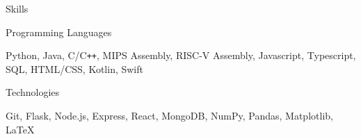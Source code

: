 \documentclass{resume}
\begin{document}
\begin{rSection}{\large Skills}
\begin{rSubsection}{Programming Languages}{}{}{}
\item Python, Java, C/C{}\verb!++!, MIPS Assembly, RISC-V Assembly, Javascript, Typescript, SQL, HTML/CSS, Kotlin, Swift
\end{rSubsection}

\begin{rSubsection}{Technologies}{}{}{}
\item Git, Flask, Node.js, Express, React, MongoDB, NumPy, Pandas, Matplotlib, LaTeX
\end{rSubsection}

\end{rSection}
\end{document}
